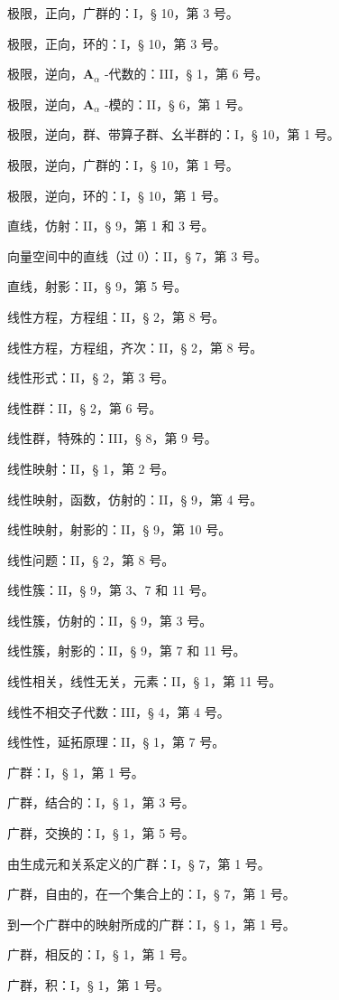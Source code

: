 极限，正向，广群的：I，§ 10，第 3 号。

极限，正向，环的：I，§ 10，第 3 号。

极限，逆向，\(\mathbf{A}_{\alpha}\) -代数的：III，§ 1，第 6 号。

极限，逆向，\(\mathbf{A}_{\alpha}\) -模的：II，§ 6，第 1 号。

极限，逆向，群、带算子群、幺半群的：I，§ 10，第 1 号。

极限，逆向，广群的：I，§ 10，第 1 号。

极限，逆向，环的：I，§ 10，第 1 号。

直线，仿射：II，§ 9，第 1 和 3 号。

向量空间中的直线（过 0）：II，§ 7，第 3 号。

直线，射影：II，§ 9，第 5 号。

线性方程，方程组：II，§ 2，第 8 号。

线性方程，方程组，齐次：II，§ 2，第 8 号。

线性形式：II，§ 2，第 3 号。

线性群：II，§ 2，第 6 号。

线性群，特殊的：III，§ 8，第 9 号。

线性映射：II，§ 1，第 2 号。

线性映射，函数，仿射的：II，§ 9，第 4 号。

线性映射，射影的：II，§ 9，第 10 号。

线性问题：II，§ 2，第 8 号。

线性簇：II，§ 9，第 3、7 和 11 号。

线性簇，仿射的：II，§ 9，第 3 号。

线性簇，射影的：II，§ 9，第 7 和 11 号。

线性相关，线性无关，元素：II，§ 1，第 11 号。

线性不相交子代数：III，§ 4，第 4 号。

线性性，延拓原理：II，§ 1，第 7 号。

广群：I，§ 1，第 1 号。

广群，结合的：I，§ 1，第 3 号。

广群，交换的：I，§ 1，第 5 号。

由生成元和关系定义的广群：I，§ 7，第 1 号。

广群，自由的，在一个集合上的：I，§ 7，第 1 号。

到一个广群中的映射所成的广群：I，§ 1，第 1 号。

广群，相反的：I，§ 1，第 1 号。

广群，积：I，§ 1，第 1 号。

